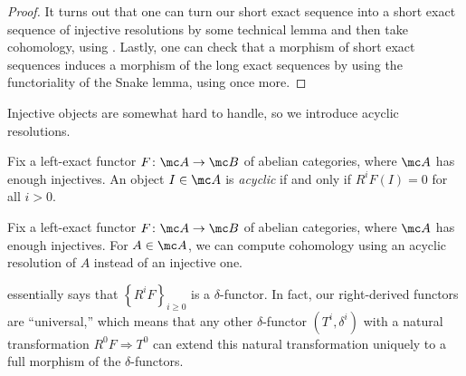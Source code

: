 \documentclass[../notes.tex]{subfiles}
\begin{document}
\begin{proof}
	It turns out that one can turn our short exact sequence into a short exact sequence of injective resolutions by some technical lemma and then take cohomology, using . Lastly, one can check that a morphism of short exact sequences induces a morphism of the long exact sequences by using the functoriality of the Snake lemma, using  once more.
\end{proof}
Injective objects are somewhat hard to handle, so we introduce acyclic resolutions.
\begin{definition}[acyclic]
	Fix a left-exact functor $F\colon\mc A\to\mc B$ of abelian categories, where $\mc A$ has enough injectives. An object $I\in\mc A$ is \textit{acyclic} if and only if $R^iF(I)=0$ for all $i>0$.
\end{definition}
\begin{proposition}
	Fix a left-exact functor $F\colon\mc A\to\mc B$ of abelian categories, where $\mc A$ has enough injectives. For $A\in\mc A$, we can compute cohomology using an acyclic resolution of $A$ instead of an injective one.
\end{proposition}
\begin{remark}
	 essentially says that $\left\{R^iF\right\}_{i\ge0}$ is a $\delta$-functor. In fact, our right-derived functors are ``universal,'' which means that any other $\delta$-functor $\left(T^i,\delta^i\right)$ with a natural transformation $R^0F\Rightarrow T^0$ can extend this natural transformation uniquely to a full morphism of the $\delta$-functors.
\end{remark}
\end{document}
